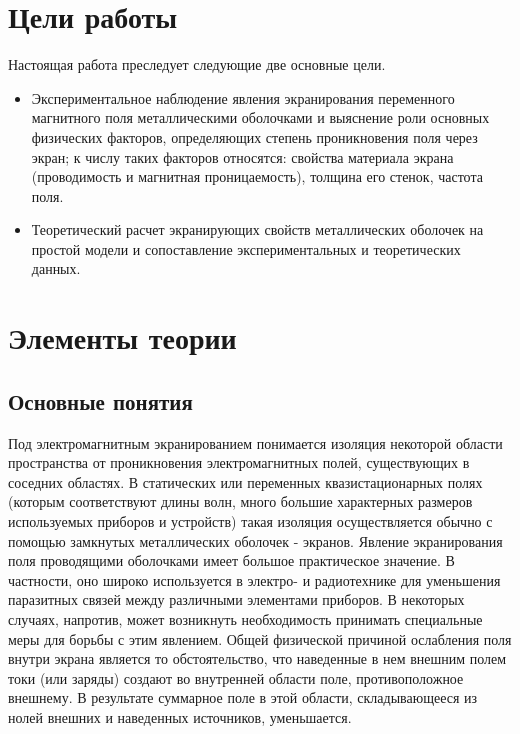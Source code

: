 
	\def\authors{Есюнин М.В., Есюнин Д.В.}
	\def\labname{Электромагнитное экранирование}
	\def\sciadviser{Павличенко И.А.}
	\def\shortlabname{Электромагнитное экранирование}



\renewcommand{\phi}{\varphi}
\renewcommand{\hat}{\widehat}

\tableofcontents

\newpage
\sloppy

\section{Цели работы}
Настоящая работа преследует следующие две основные цели.
\begin{itemize}
	\item Экспериментальное наблюдение явления экранирования переменного магнитного поля металлическими оболочками и выяснение роли основных физических факторов, определяющих степень проникновения поля через экран; к числу таких факторов относятся: свойства материала экрана (проводимость и магнитная проницаемость), толщина его стенок, частота поля.
	\item Теоретический расчет экранирующих свойств металлических оболочек на простой модели и сопоставление экспериментальных и теоретических данных.
\end{itemize}
\section{Элементы теории}
\subsection{Основные понятия}
Под электромагнитным экранированием понимается изоляция некоторой области пространства от проникновения электромагнитных полей, существующих в соседних областях. В статических или переменных квазистационарных полях (которым соответствуют длины волн, много большие характерных размеров используемых приборов и устройств) такая изоляция осуществляется обычно с помощью замкнутых металлических оболочек - экранов. Явление экранирования поля проводящими оболочками имеет большое практическое значение. В частности, оно широко используется в электро- и радиотехнике для уменьшения паразитных связей между различными элементами приборов. В некоторых случаях, напротив, может возникнуть необходимость принимать специальные меры для борьбы с этим явлением.
Общей физической причиной ослабления поля внутри 
экрана является то обстоятельство, что наведенные в нем внешним полем токи (или заряды) создают во внутренней области поле, противоположное внешнему. В результате суммарное поле в этой области, складывающееся из нолей внешних и наведенных источников, уменьшается.

